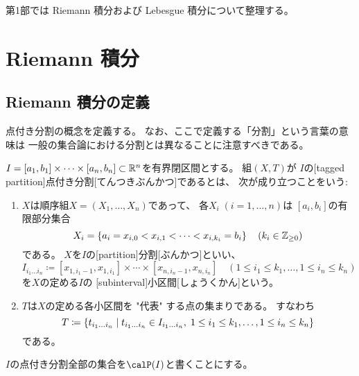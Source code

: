 \documentclass[report]{jlreq}
\begin{document}
第1部では Riemann 積分および Lebesgue 積分について整理する。

%
\chapter{Riemann 積分}

%
\section{Riemann 積分の定義}

点付き分割の概念を定義する。
なお、ここで定義する「分割」という言葉の意味は
一般の集合論における分割とは異なることに注意すべきである。

\begin{definition}[点付き分割]
    $I = [a_1, b_1] \times \cdots \times [a_n, b_n] \subset \mathbb{R}^n$を有界閉区間とする。
    組$(X, T)$が
    $I$の[tagged partition]{点付き分割}[てんつきぶんかつ]であるとは、
    次が成り立つことをいう:
    \begin{enumerate}
        \item $X$は順序組$X = (X_1, \dots, X_n)$であって、
            各$X_i \; (i = 1, \dots, n)$は
            $[a_i, b_i]$の有限部分集合
            \begin{equation}
                X_i = \left\{{
                        a_i = x_{i, 0} < x_{i, 1} < \cdots < x_{i, k_i} = b_i
                    }\right\}
                    \quad
                    (k_i \in \mathbb{Z}_{\ge 0})
            \end{equation}
            である。
            $X$を$I$の[partition]{分割}[ぶんかつ]といい、
            \begin{equation}
                I_{i_1 \dots i_n}
                    \coloneqq
                    [x_{1, i_1 - 1}, x_{1, i_1}]
                    \times \cdots \times
                    [x_{n, i_n - 1}, x_{n, i_n}]
                    \quad
                    (1 \le i_1 \le k_1, \dots, 1 \le i_n \le k_n)
            \end{equation}
            を$X$の定める$I$の
            [subinterval]{小区間}[しょうくかん]という。
        \item $T$は$X$の定める各小区間を "代表" する点の集まりである。
            すなわち
            \begin{equation}
                T \coloneqq \left\{{
                    t_{i_1 \dots i_n}
                    \mid
                    t_{i_1 \dots i_n} \in I_{i_1 \dots i_n}, \;
                    1 \le i_1 \le k_1, \dots, 1 \le i_n \le k_n
                }\right\}
            \end{equation}
            である。
    \end{enumerate}
    $I$の点付き分割全部の集合を$\calP(I)$と書くことにする。
\end{definition}
\end{document}
